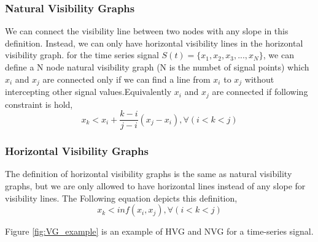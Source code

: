 \documentclass[conference]{IEEEtran}
\begin{document}
\subsubsection{Natural Visibility Graphs}
We can connect the visibility line between two nodes with any slope in this definition. Instead, we can only have horizontal visibility lines in the horizontal visibility graph.
for the time series signal $S(t)=\{x_1,x_2,x_3,...,x_N\}$, we can define a N node natural visibility graph (N is the numbet of signal points) which $x_i$ and $x_j$ are connected only if we can find a line from $x_i$ to $x_j$ without intercepting other signal values.Equivalently $x_i$ and $x_j$ are connected if following constraint is hold,
\begin{equation}
x_k < x_i +\frac{k-i}{j-i}(x_j-x_i), \forall(i<k<j)
\end{equation}



\subsubsection{Horizontal Visibility Graphs}
The definition of horizontal visibility graphs is the same as natural visibility graphs, but we are only allowed to have horizontal lines instead of any slope for visibility lines. The Following equation depicts this definition,
\begin{equation}
x_k < inf(x_i, x_j), \forall(i<k<j)
\end{equation}

Figure \ref{fig:VG_example} is an example of HVG and NVG for a time-series signal.
\end{document}
